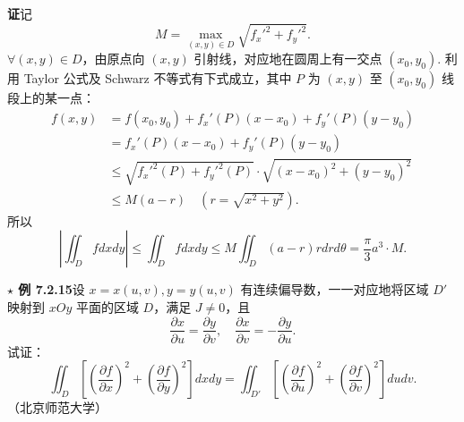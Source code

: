 \documentclass[UTF8,12pt,a4paper,fontset=fandol]{ctexart}
\begin{document}
\noindent\textbf{证}\quad 记
\[
M=\max_{(x,y)\in D}\sqrt{f_x'^2+f_y'^2}.
\]
$\forall(x,y)\in D$，由原点向 $(x,y)$ 引射线，对应地在圆周上有一交点 $(x_0,y_0)$. 利用 Taylor 公式及 Schwarz 不等式有下式成立，其中 $P$ 为 $(x,y)$ 至 $(x_0,y_0)$ 线段上的某一点：
\[
\begin{aligned}
f(x,y)&=f(x_0,y_0)+f_x'(P)(x-x_0)+f_y'(P)(y-y_0)\\
&=f_x'(P)(x-x_0)+f_y'(P)(y-y_0)\\
&\le\sqrt{f_x'^2(P)+f_y'^2(P)}\cdot
\sqrt{(x-x_0)^2+(y-y_0)^2}\\
&\le M(a-r)\quad(r=\sqrt{x^2+y^2}).
\end{aligned}
\]
所以
\[
\left|\iint_D fdxdy\right|\le\iint_Dfdxdy
\le M\iint_D(a-r)rdrd\theta=\frac\pi3a^3\cdot M.
\]

\noindent\textbf{$\star$ 例 7.2.15}\quad 设 $x=x(u,v),y=y(u,v)$ 有连续偏导数，一一对应地将区域 $D'$ 映射到 $xOy$ 平面的区域 $D$，满足 $J\ne0$，且
\[
\frac{\partial x}{\partial u}=\frac{\partial y}{\partial v},\quad
\frac{\partial x}{\partial v}=-\frac{\partial y}{\partial u}. \tag{1}
\]
试证：
\[
\iint_D\left[\left(\frac{\partial f}{\partial x}\right)^2+
\left(\frac{\partial f}{\partial y}\right)^2\right]dxdy
=\iint_{D'}\left[\left(\frac{\partial f}{\partial u}\right)^2+
\left(\frac{\partial f}{\partial v}\right)^2\right]dudv. \tag{2}
\]
（北京师范大学）
\end{document}
